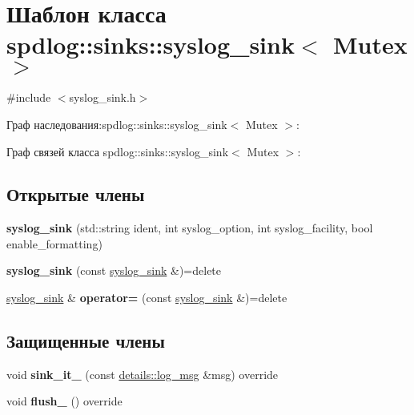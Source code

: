\hypertarget{classspdlog_1_1sinks_1_1syslog__sink}{}\section{Шаблон класса spdlog\+:\+:sinks\+:\+:syslog\+\_\+sink$<$ Mutex $>$}
\label{classspdlog_1_1sinks_1_1syslog__sink}


{\ttfamily \#include $<$syslog\+\_\+sink.\+h$>$}



Граф наследования\+:spdlog\+:\+:sinks\+:\+:syslog\+\_\+sink$<$ Mutex $>$\+:


Граф связей класса spdlog\+:\+:sinks\+:\+:syslog\+\_\+sink$<$ Mutex $>$\+:
\subsection*{Открытые члены}
\begin{DoxyCompactItemize}
\item 
\mbox{\label{classspdlog_1_1sinks_1_1syslog__sink_a3437d71fc19b96320b3cc3a492acd1c4}} 
{\bfseries syslog\+\_\+sink} (std\+::string ident, int syslog\+\_\+option, int syslog\+\_\+facility, bool enable\+\_\+formatting)
\item 
\mbox{\label{classspdlog_1_1sinks_1_1syslog__sink_a505adae200592eab1e093ab258ad0291}} 
{\bfseries syslog\+\_\+sink} (const \hyperlink{classspdlog_1_1sinks_1_1syslog__sink}{syslog\+\_\+sink} \&)=delete
\item 
\mbox{\label{classspdlog_1_1sinks_1_1syslog__sink_a3e2454370f91c3fe2befb3f24e25ede7}} 
\hyperlink{classspdlog_1_1sinks_1_1syslog__sink}{syslog\+\_\+sink} \& {\bfseries operator=} (const \hyperlink{classspdlog_1_1sinks_1_1syslog__sink}{syslog\+\_\+sink} \&)=delete
\end{DoxyCompactItemize}
\subsection*{Защищенные члены}
\begin{DoxyCompactItemize}
\item 
\mbox{\label{classspdlog_1_1sinks_1_1syslog__sink_a303bccf40cd03356510391c493078005}} 
void {\bfseries sink\+\_\+it\+\_\+} (const \hyperlink{structspdlog_1_1details_1_1log__msg}{details\+::log\+\_\+msg} \&msg) override
\item 
\mbox{\label{classspdlog_1_1sinks_1_1syslog__sink_a6afb5ba7ef5e5f2950e624ec650fb562}} 
void {\bfseries flush\+\_\+} () override
\end{DoxyCompactItemize}
